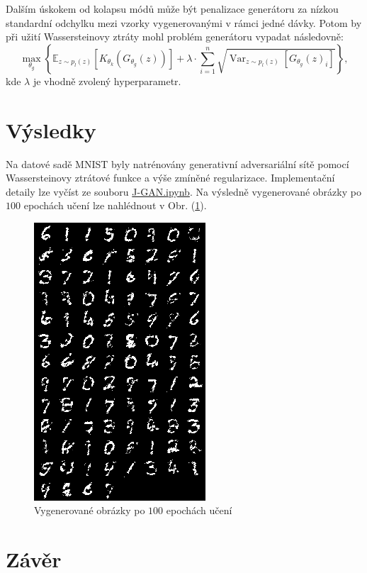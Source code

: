 \documentclass[czech]{article}
\begin{document}
Dalším úskokem od kolapsu módů může být penalizace generátoru za nízkou standardní odchylku mezi vzorky vygenerovanými v rámci jedné dávky.
Potom by při užití Wassersteinovy ztráty mohl problém generátoru vypadat následovně:
\begin{equation}
    \max_{\theta_g} \left\{ \mathbb{E}_{z \sim p_l(z)} \left[K_{\theta_k}\left(G_{\theta_g}(z)\right)\right]
     + \lambda \cdot \sum_{i = 1}^{n} \sqrt{\operatorname{Var}_{z \sim p_l(z)} \left[G_{\theta_g}(z)_i\right]}\right\},
\end{equation}
kde $\lambda$ je vhodně zvolený hyperparametr.

\section{Výsledky}

Na datové sadě MNIST \cite{MNIST} byly natrénovány generativní adversariální sítě pomocí Wassersteinovy ztrátové funkce
a výše zmíněné regularizace.
Implementační detaily lze vyčíst ze souboru \href{https://github.com/pavel-jaks/gans/blob/main/code/J-GAN.ipynb}{J-GAN.ipynb}.
Na výsledně vygenerované obrázky po $100$ epochách učení lze nahlédnout v Obr. (\ref{obr}).

\begin{figure}
    \centering
    \includegraphics{graphics/samples_100.png}
    \caption{Vygenerované obrázky po $100$ epochách učení}
    \label{obr}
\end{figure}

\section*{Závěr}
\end{document}
